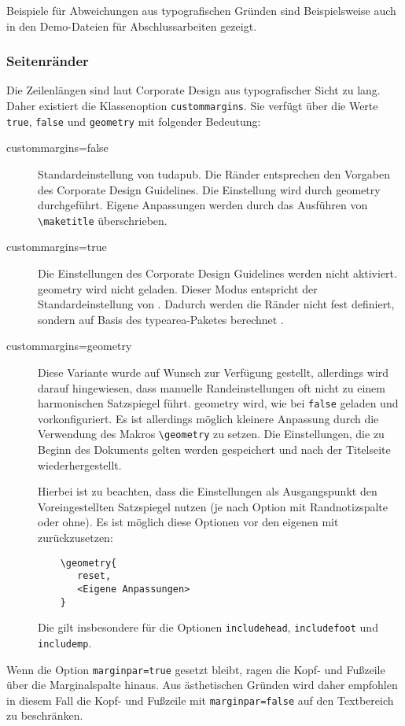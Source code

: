 \documentclass[
	ngerman,
	accentcolor=9c,%
	]{tudapub}
\let\code\texttt
\let\pck\textsf
\let\cls\textsf
\begin{document}
Beispiele für Abweichungen aus typografischen Gründen sind Beispielsweise auch in den Demo-Dateien für Abschlussarbeiten gezeigt.

\subsubsection{Seitenränder}
Die Zeilenlängen sind laut Corporate Design aus typografischer Sicht zu lang.
Daher existiert die Klassenoption \code{custommargins}. Sie verfügt über die Werte \code{true}, \code{false} und \code{geometry} mit folgender Bedeutung:

\begin{description}
\item[custommargins=false] Standardeinstellung von \cls{tudapub}. Die Ränder entsprechen den Vorgaben des Corporate Design Guidelines. Die Einstellung wird durch \pck{geometry} durchgeführt. Eigene Anpassungen werden durch das Ausführen von \code{\textbackslash{}maketitle} überschrieben.
\item[custommargins=true] Die Einstellungen des Corporate Design Guidelines werden nicht aktiviert. \pck{geometry} wird nicht geladen. Dieser Modus entspricht der Standardeinstellung von \KOMAScript{}. Dadurch werden die Ränder nicht fest definiert, sondern auf Basis des \pck{typearea}-Paketes berechnet \cite[vgl.][]{scrguide}.
\item[custommargins=geometry]  Diese Variante wurde auf Wunsch zur Verfügung gestellt, allerdings wird darauf hingewiesen, dass manuelle Randeinstellungen oft nicht zu einem harmonischen Satzspiegel führt.
\pck{geometry} wird, wie bei \code{false} geladen und vorkonfiguriert. Es ist allerdings möglich kleinere Anpassung durch die Verwendung des Makros \code{\textbackslash{}geometry} zu setzen. Die Einstellungen, die zu Beginn des Dokuments gelten werden gespeichert und nach der Titelseite wiederhergestellt.

Hierbei ist zu beachten, dass die Einstellungen als Ausgangspunkt den Voreingestellten Satzspiegel nutzen (je nach Option mit Randnotizspalte oder ohne). Es ist möglich diese Optionen vor den eigenen mit zurückzusetzen:
\begin{verbatim}
	\geometry{
	   reset,
	   <Eigene Anpassungen>
	}
\end{verbatim}
Die gilt insbesondere für die Optionen \code{includehead}, \code{includefoot} und \code{includemp}.
\end{description}

Wenn die Option \code{marginpar=true} gesetzt bleibt, ragen die Kopf- und Fußzeile über die Marginalspalte hinaus. Aus ästhetischen Gründen wird daher empfohlen in diesem Fall die Kopf- und Fußzeile  mit \code{marginpar=false}  auf den Textbereich zu beschränken.
\end{document}
